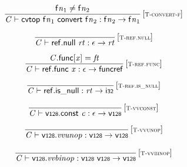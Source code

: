 $$
\begin{array}{@{}c@{}}\displaystyle
\frac{
{{\mathsf{f}}{{\mathit{n}}}}_{{1}} \neq {{\mathsf{f}}{{\mathit{n}}}}_{{2}}
}{
{\mathit{C}} \vdash \mathsf{cvtop}~{{\mathsf{f}}{{\mathit{n}}}}_{{1}}~\mathsf{convert}~{{\mathsf{f}}{{\mathit{n}}}}_{{2}} : {{\mathsf{f}}{{\mathit{n}}}}_{{2}} \rightarrow {{\mathsf{f}}{{\mathit{n}}}}_{{1}}
} \, {[\textsc{\scriptsize T{-}convert{-}f}]}
\qquad
\end{array}
$$

\vspace{1ex}

$$
\begin{array}{@{}c@{}}\displaystyle
\frac{
}{
{\mathit{C}} \vdash \mathsf{ref.null}~{\mathit{rt}} : \epsilon \rightarrow {\mathit{rt}}
} \, {[\textsc{\scriptsize T{-}ref.null}]}
\qquad
\end{array}
$$

$$
\begin{array}{@{}c@{}}\displaystyle
\frac{
{\mathit{C}}.\mathsf{func}{}[{\mathit{x}}] = {\mathit{ft}}
}{
{\mathit{C}} \vdash \mathsf{ref.func}~{\mathit{x}} : \epsilon \rightarrow \mathsf{funcref}
} \, {[\textsc{\scriptsize T{-}ref.func}]}
\qquad
\end{array}
$$

$$
\begin{array}{@{}c@{}}\displaystyle
\frac{
}{
{\mathit{C}} \vdash \mathsf{ref.is\_null} : {\mathit{rt}} \rightarrow \mathsf{i{\scriptstyle32}}
} \, {[\textsc{\scriptsize T{-}ref.is\_null}]}
\qquad
\end{array}
$$

\vspace{1ex}

$$
\begin{array}{@{}c@{}}\displaystyle
\frac{
}{
{\mathit{C}} \vdash \mathsf{v{\scriptstyle128}}.\mathsf{const}~{\mathit{c}} : \epsilon \rightarrow \mathsf{v{\scriptstyle128}}
} \, {[\textsc{\scriptsize T{-}vvconst}]}
\qquad
\end{array}
$$

$$
\begin{array}{@{}c@{}}\displaystyle
\frac{
}{
{\mathit{C}} \vdash \mathsf{v{\scriptstyle128}} . {\mathit{vvunop}} : \mathsf{v{\scriptstyle128}} \rightarrow \mathsf{v{\scriptstyle128}}
} \, {[\textsc{\scriptsize T{-}vvunop}]}
\qquad
\end{array}
$$

$$
\begin{array}{@{}c@{}}\displaystyle
\frac{
}{
{\mathit{C}} \vdash \mathsf{v{\scriptstyle128}} . {\mathit{vvbinop}} : \mathsf{v{\scriptstyle128}}~\mathsf{v{\scriptstyle128}} \rightarrow \mathsf{v{\scriptstyle128}}
} \, {[\textsc{\scriptsize T{-}vvbinop}]}
\qquad
\end{array}
$$

